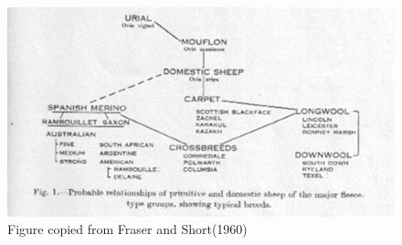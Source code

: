%

\begin{figure}[!h]
  \centering
   \includegraphics[width=1.0\textwidth]{fraser1crop.png}
  \caption{Figure copied from Fraser and Short(1960)~\cite{fras:60}}
  \label{fig:fraser}
\end{figure}

%

